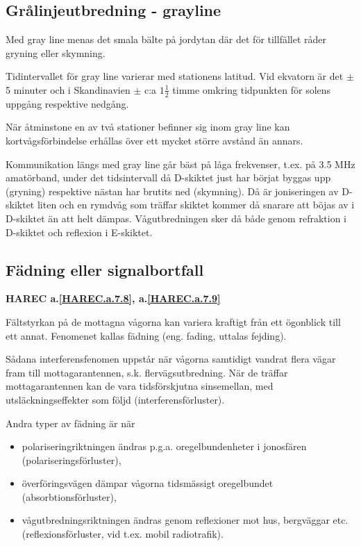 \subsection{Grålinjeutbredning - grayline}

Med gray line menas det smala bälte på jordytan där det för tillfället
råder gryning eller skymning.

Tidintervallet för gray line varierar med stationens latitud. Vid
ekvatorn är det \(\pm\) 5 minuter och i Skandinavien \(\pm\) c:a
\(1\frac{1}{2}\) timme omkring tidpunkten för solens uppgång
respektive nedgång.

När åtminstone en av två stationer befinner sig inom gray line kan
kortvågsförbindelse erhållas över ett mycket större avstånd än annars.

Kommunikation längs med gray line går bäst på låga frekvenser,
t.ex. på 3.5 MHz amatörband, under det tidsintervall då D-skiktet just
har börjat byggas upp (gryning) respektive nästan har brutits ned
(skymning). Då är joniseringen av D-skiktet liten och en rymdvåg som
träffar skiktet kommer då snarare att böjas av i D-skiktet än att helt
dämpas. Vågutbredningen sker då både genom refraktion i D-skiktet och
reflexion i E-skiktet.

\subsection{Fädning eller signalbortfall}
\textbf{
HAREC a.\ref{HAREC.a.7.8}\label{myHAREC.a.7.8},
 a.\ref{HAREC.a.7.9}\label{myHAREC.a.7.9}
}

Fältstyrkan på de mottagna vågorna kan variera kraftigt från ett
ögonblick till ett annat. Fenomenet kallas fädning (eng. fading,
uttalas fejding).

Sådana interferensfenomen uppstår när vågorna samtidigt vandrat flera
vägar fram till mottagarantennen, s.k. flervägsutbredning. När de
träffar mottagarantennen kan de vara tidsförskjutna sinsemellan, med
utsläckningseffekter som följd (interferensförluster).

Andra typer av fädning är när
\begin{itemize}
\item polariseringriktningen ändras p.g.a. oregelbundenheter i
  jonosfären (polariseringsförluster),
\item överföringsvägen dämpar vågorna tidsmässigt oregelbundet
  (absorbtionsförluster),
\item vågutbredningsriktningen ändras genom reflexioner mot hus,
  bergväggar etc. (reflexionsförluster, vid t.ex. mobil radiotrafik).
\end{itemize}

